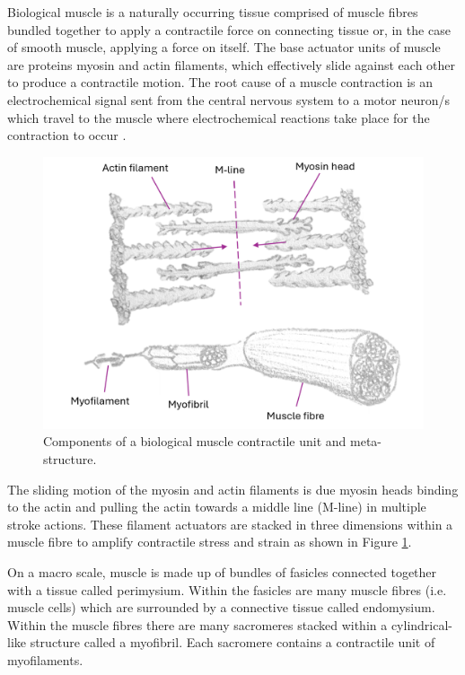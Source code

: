 Biological muscle is a naturally occurring tissue comprised of muscle fibres bundled together to apply a contractile force on connecting tissue or, in the case of smooth muscle, applying a force on itself. The base actuator units of muscle are proteins myosin and actin filaments, which effectively slide against each other to produce a contractile motion. The root cause of a muscle contraction is an electrochemical signal sent from the central nervous system to a motor neuron/s which travel to the muscle where electrochemical reactions take place for the contraction to occur \cite{Keynes2011}.
\begin{figure}[H]
	\centering
	\includegraphics[width=0.6\linewidth]{Figures/motor-unit-myo-fibril-to-fibre.png}
	\caption{Components of a biological muscle contractile unit and meta-structure.}
	\label{fig:muscle_units}
\end{figure}
The sliding motion of the myosin and actin filaments is due myosin heads binding to the actin and pulling the actin towards a middle line (M-line) in multiple stroke actions. These filament actuators are stacked in three dimensions within a muscle fibre to amplify contractile stress and strain as shown in Figure \ref{fig:muscle_units}.

On a macro scale, muscle is made up of bundles of fasicles connected together with a tissue called perimysium. Within the fasicles are many muscle fibres (i.e. muscle cells) which are surrounded by a connective tissue called endomysium. Within the muscle fibres there are many sacromeres stacked within a cylindrical-like structure called a myofibril. Each sacromere contains a contractile unit of myofilaments. 



